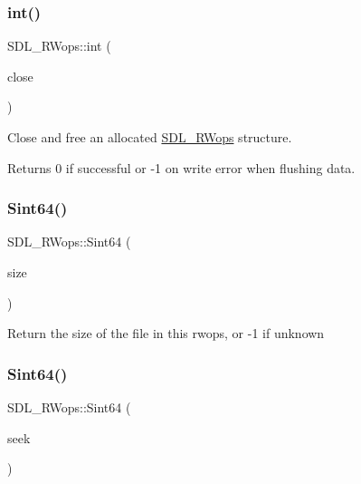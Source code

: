 \subsubsection{\texorpdfstring{int()}{int()}}
{\footnotesize\ttfamily S\+D\+L\+\_\+\+R\+Wops\+::int (\begin{DoxyParamCaption}\item[{\hyperlink{begin__code_8h_a81faf4ba0455dc75f2e0507eddb79401}{S\+D\+L\+C\+A\+LL} $\ast$}]{close }\end{DoxyParamCaption})}

Close and free an allocated \hyperlink{struct_s_d_l___r_wops}{S\+D\+L\+\_\+\+R\+Wops} structure.

\begin{DoxyReturn}{Returns}
0 if successful or -\/1 on write error when flushing data. 
\end{DoxyReturn}
\mbox{\label{struct_s_d_l___r_wops_a45f66dbb683a88281d96f83ca18c525f}} 
\subsubsection{\texorpdfstring{Sint64()}{Sint64()}\hspace{0.1cm}{\footnotesize\ttfamily [1/2]}}
{\footnotesize\ttfamily S\+D\+L\+\_\+\+R\+Wops\+::\+Sint64 (\begin{DoxyParamCaption}\item[{\hyperlink{begin__code_8h_a81faf4ba0455dc75f2e0507eddb79401}{S\+D\+L\+C\+A\+LL} $\ast$}]{size }\end{DoxyParamCaption})}

Return the size of the file in this rwops, or -\/1 if unknown \mbox{\label{struct_s_d_l___r_wops_a767114391a3d1b4a7c214da3e164acf5}} 
\subsubsection{\texorpdfstring{Sint64()}{Sint64()}\hspace{0.1cm}{\footnotesize\ttfamily [2/2]}}
{\footnotesize\ttfamily S\+D\+L\+\_\+\+R\+Wops\+::\+Sint64 (\begin{DoxyParamCaption}\item[{\hyperlink{begin__code_8h_a81faf4ba0455dc75f2e0507eddb79401}{S\+D\+L\+C\+A\+LL} $\ast$}]{seek }\end{DoxyParamCaption})}

